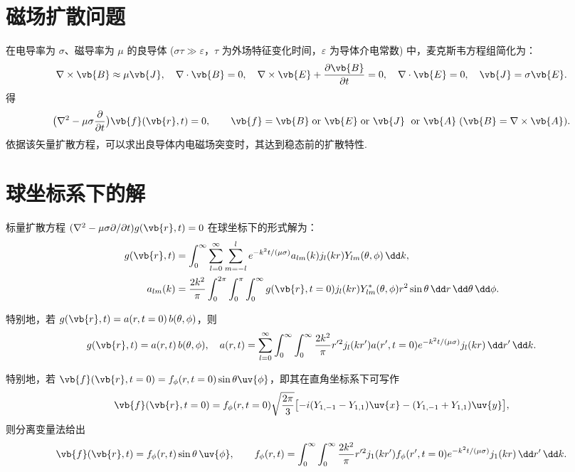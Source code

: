 \section{磁场扩散问题}
在电导率为 \(\sigma\)、磁导率为 \(\mu\) 的良导体 (\(\sigma\tau \gg \varepsilon\)，\(\tau\) 为外场特征变化时间，\(\varepsilon\) 为导体介电常数) 中，麦克斯韦方程组简化为：
\begin{align*}
	\nabla \times \vb{B} \approx \mu \vb{J}, \quad
	\nabla \cdot \vb{B} = 0, \quad
	\nabla \times \vb{E} + \frac{\partial \vb{B}}{\partial t} = 0, \quad
	\nabla \cdot \vb{E} = 0, \quad
	\vb{J} = \sigma \vb{E}.
\end{align*}
得
\begin{align*}
	\bigl(\nabla^2 - \mu\sigma \frac{\partial}{\partial t}\bigr) \vb{f}(\vb{r}, t) = 0, \qquad
	\vb{f} = \vb{B} \;\text{or } \vb{E} \;\text{or } \vb{J} \;\text{ or } \vb{A}\;(\vb{B} = \nabla \times \vb{A}).
\end{align*}
依据该矢量扩散方程，可以求出良导体内电磁场突变时，其达到稳态前的扩散特性.

\section{球坐标系下的解}
标量扩散方程 \((\nabla^2 - \mu\sigma \partial/\partial t) g(\vb{r}, t) = 0\) 在球坐标下的形式解为：
\begin{align*}
	g(\vb{r}, t) &= \int_0^\infty \sum_{l=0}^\infty \sum_{m=-l}^l e^{-k^2 t/(\mu\sigma)} a_{lm}(k) j_l(kr) Y_{lm}(\theta,\phi) \,\dd k,\\
	a_{lm}(k) &= \frac{2k^2}{\pi} \int_0^{2\pi} \int_0^\pi \int_0^\infty g(\vb{r}, t=0) j_l(kr) Y_{lm}^*(\theta,\phi) r^2 \sin\theta \,\dd r \,\dd \theta \,\dd \phi.
\end{align*}

特别地，若 \(g(\vb{r}, t) = a(r, t=0) \,b(\theta,\phi)\)，则
\begin{align*}
	g(\vb{r}, t) = a(r,t)\, b(\theta,\phi),\quad
	a(r,t) = \sum_{l=0}^\infty \int_0^\infty \int_0^\infty \frac{2k^2}{\pi} r'^2 j_l(kr') a(r',t=0) e^{-k^2 t/(\mu\sigma)} j_l(kr) \,\dd r' \,\dd k.
\end{align*}

特别地，若 \(\vb{f}(\vb{r}, t=0) = f_\phi(r, t=0) \sin\theta \uv{\phi}\)，即其在直角坐标系下可写作
\begin{align*}
	\vb{f}(\vb{r}, t=0) = f_\phi(r, t=0) \sqrt{\frac{2\pi}{3}} \bigl[-i(Y_{1,-1} - Y_{1,1}) \uv{x} - (Y_{1,-1} + Y_{1,1}) \uv{y}\bigr],
\end{align*}
则分离变量法给出
\begin{align*}
	\vb{f}(\vb{r}, t) = f_\phi(r,t) \sin\theta\, \uv{\phi},\qquad
	f_\phi(r,t) = \int_0^\infty \int_0^\infty \frac{2k^2}{\pi} r'^2 j_1(kr') f_\phi(r',t=0) e^{-k^2 t/(\mu\sigma)} j_1(kr) \,\dd r' \,\dd k.
\end{align*}

